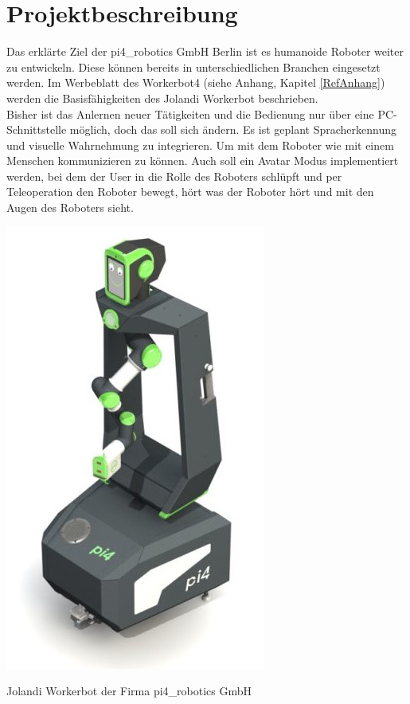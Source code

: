 \section{Projektbeschreibung}
Das erklärte Ziel der pi4\_robotics GmbH Berlin ist es humanoide Roboter weiter zu entwickeln. 
Diese können bereits in unterschiedlichen Branchen eingesetzt werden. Im Werbeblatt 
des Workerbot4 (siehe Anhang, Kapitel \ref{RefAnhang}) werden die Basisfähigkeiten des Jolandi Workerbot beschrieben.  \\
Bisher ist das Anlernen neuer Tätigkeiten und die Bedienung nur über eine PC-Schnittstelle möglich, doch das soll sich ändern. Es ist geplant Spracherkennung und visuelle Wahrnehmung 
zu integrieren. Um mit dem Roboter wie mit einem Menschen kommunizieren zu können. Auch soll 
ein Avatar Modus implementiert werden, bei dem der User in die Rolle des Roboters schlüpft 
und per Teleoperation den Roboter bewegt, hört was der Roboter hört und mit den Augen des Roboters sieht. \\
\begin{minipage}{\textwidth}
    \begin{center}
        \includegraphics[scale=0.5]{img/jolandi.jpg} 
    \end{center}
\end{minipage}
\begin{center}
Jolandi Workerbot der Firma pi4\_robotics GmbH
\end{center}
 

